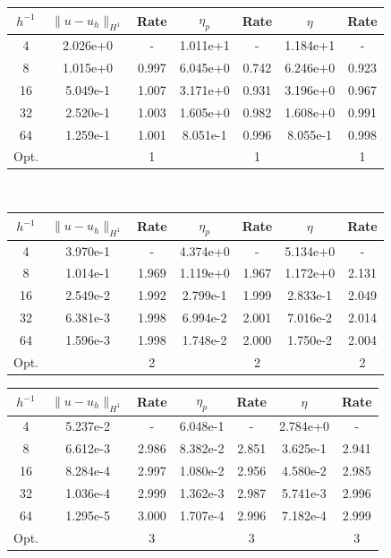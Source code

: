 \\
\begin{center}
\centering
\begin{tabular}{c|c|c|c|c|c|c} 
$h^{-1}$ & $\|u-u_h \|_{H^1}$ & Rate & $\eta_p$ & Rate & $\eta$ & Rate\\\hline
4 & 2.026e+0  & -     & 1.011e+1 & -     & 1.184e+1 &   -\\
8 & 1.015e+0  & 0.997 & 6.045e+0 & 0.742 & 6.246e+0 & 0.923 \\
16 & 5.049e-1 & 1.007 & 3.171e+0 & 0.931 & 3.196e+0 & 0.967\\
32 & 2.520e-1 & 1.003 & 1.605e+0 & 0.982 & 1.608e+0 & 0.991 \\
64 & 1.259e-1 & 1.001 & 8.051e-1 & 0.996 & 8.055e-1 & 0.998 \\\hline
Opt. & & 1 & & 1 & & 1
\end{tabular}
 \label{tab:poisson_P1}
\end{center}
\mbox{}\\
\begin{center} 
\centering
\begin{tabular}{c|c|c|c|c|c|c}
$h^{-1}$ & $\|u-u_h \|_{H^1}$ & Rate & $\eta_p$ & Rate & $\eta$ & Rate\\\hline
4  & 3.970e-1 & -     & 4.374e+0 & - 	& 5.134e+0 &   -\\
8  & 1.014e-1 & 1.969 & 1.119e+0 & 1.967 & 1.172e+0 & 2.131 \\
16 & 2.549e-2 & 1.992 & 2.799e-1 & 1.999 & 2.833e-1 & 2.049\\
32 & 6.381e-3 & 1.998 & 6.994e-2 & 2.001 & 7.016e-2 & 2.014 \\
64 & 1.596e-3 & 1.998 & 1.748e-2 & 2.000 & 1.750e-2 & 2.004  \\\hline
Opt. & & 2 & & 2 & & 2
\end{tabular}
 \label{tab:poisson_P2}
\end{center}
\begin{center} 
\centering
\begin{tabular}{c|c|c|c|c|c|c}
$h^{-1}$ & $\|u-u_h \|_{H^1}$ & Rate & $\eta_p$ & Rate & $\eta$ & Rate\\\hline
4  & 5.237e-2 & -     & 6.048e-1 & -     & 2.784e+0 & - \\
8  & 6.612e-3 & 2.986 & 8.382e-2 & 2.851 & 3.625e-1 & 2.941 \\
16 & 8.284e-4 & 2.997 & 1.080e-2 & 2.956 & 4.580e-2 & 2.985 \\
32 & 1.036e-4 & 2.999 & 1.362e-3 & 2.987 & 5.741e-3 & 2.996 \\
64 & 1.295e-5 & 3.000 & 1.707e-4 & 2.996 & 7.182e-4 & 2.999 \\\hline
Opt. & & 3 & & 3 & & 3
\end{tabular}
 \label{tab:poisson_P3}
\end{center}
